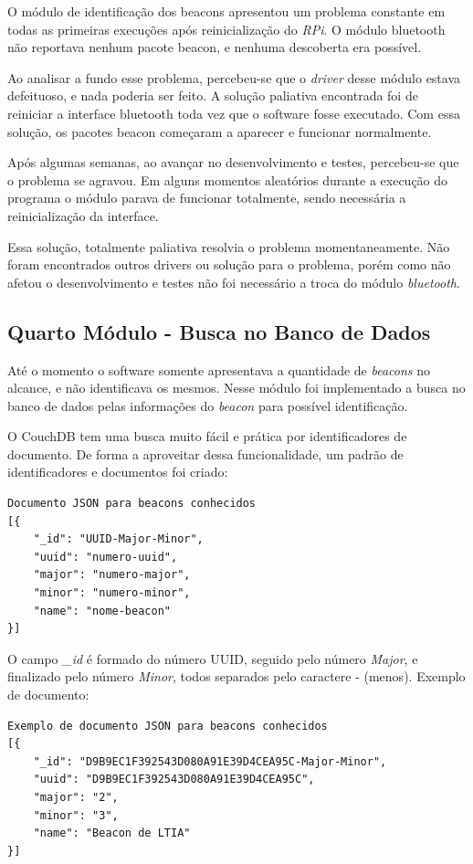 O módulo de identificação dos beacons apresentou um problema constante em todas as primeiras execuções após reinicialização do \textit{RPi}. O módulo bluetooth não reportava nenhum pacote beacon, e nenhuma descoberta era possível. 

Ao analisar a fundo esse problema, percebeu-se que o \textit{driver} desse módulo estava defeituoso, e nada poderia ser feito. A solução paliativa encontrada foi de reiniciar a interface bluetooth toda vez que o software fosse executado. Com essa solução, os pacotes beacon começaram a aparecer e funcionar normalmente.

Após algumas semanas, ao avançar no desenvolvimento e testes, percebeu-se que o problema se agravou. Em alguns momentos aleatórios durante a execução do programa o módulo parava de funcionar totalmente, sendo necessária a reinicialização da interface.

Essa solução, totalmente paliativa resolvia o problema momentaneamente. Não foram encontrados outros drivers ou solução para o problema, porém como não afetou o desenvolvimento e testes não foi necessário a troca do módulo \textit{bluetooth}.

\subsection{Quarto Módulo - Busca no Banco de Dados}\label{sec:quarto-modulo}

Até o momento o software somente apresentava a quantidade de \textit{beacons} no alcance, e não identificava os mesmos. Nesse módulo foi implementado a busca no banco de dados pelas informações do \textit{beacon} para possível identificação.

O CouchDB tem uma busca muito fácil e prática por identificadores de documento. De forma a aproveitar dessa funcionalidade, um padrão de identificadores e documentos foi criado:

\begin{verbatim}
Documento JSON para beacons conhecidos
[{
    "_id": "UUID-Major-Minor",
    "uuid": "numero-uuid",
    "major": "numero-major",
    "minor": "numero-minor",
    "name": "nome-beacon"
}]
\end{verbatim}

O campo \textit{\_id} é formado do número UUID, seguido pelo número \textit{Major}, e finalizado pelo número \textit{Minor}, todos separados pelo caractere - (menos). Exemplo de documento:

\begin{verbatim}
Exemplo de documento JSON para beacons conhecidos
[{
    "_id": "D9B9EC1F392543D080A91E39D4CEA95C-Major-Minor",
    "uuid": "D9B9EC1F392543D080A91E39D4CEA95C",
    "major": "2",
    "minor": "3",
    "name": "Beacon de LTIA"
}]
\end{verbatim}

